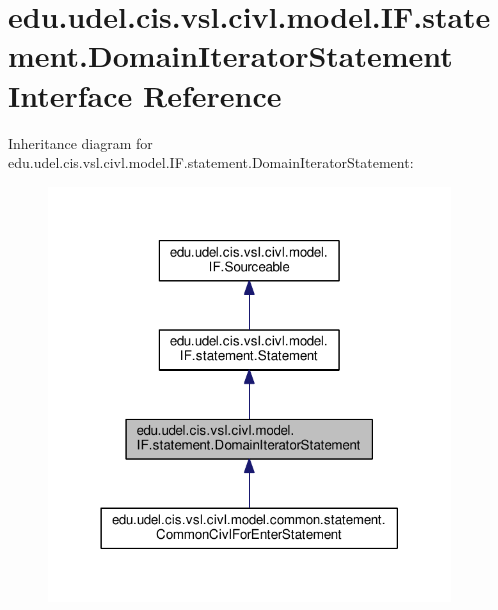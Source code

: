 \hypertarget{interfaceedu_1_1udel_1_1cis_1_1vsl_1_1civl_1_1model_1_1IF_1_1statement_1_1DomainIteratorStatement}{}\section{edu.\+udel.\+cis.\+vsl.\+civl.\+model.\+I\+F.\+statement.\+Domain\+Iterator\+Statement Interface Reference}
\label{interfaceedu_1_1udel_1_1cis_1_1vsl_1_1civl_1_1model_1_1IF_1_1statement_1_1DomainIteratorStatement}


Inheritance diagram for edu.\+udel.\+cis.\+vsl.\+civl.\+model.\+I\+F.\+statement.\+Domain\+Iterator\+Statement\+:
\nopagebreak
\begin{figure}[H]
\begin{center}
\leavevmode
\includegraphics[width=302pt]{interfaceedu_1_1udel_1_1cis_1_1vsl_1_1civl_1_1model_1_1IF_1_1statement_1_1DomainIteratorStatement__inherit__graph}
\end{center}
\end{figure}


